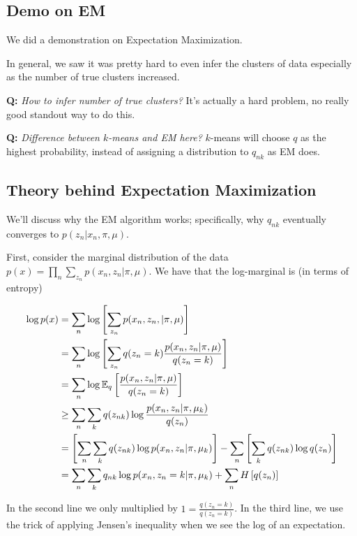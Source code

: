 \documentclass{article}
\begin{document}
\subsection{Demo on EM}

We did a demonstration on Expectation Maximization.

In general, we saw it was pretty hard to even infer the clusters of data especially as the number of true clusters increased. 

{\bf Q:} \emph{How to infer number of true clusters?}  It's actually a hard problem, no really good standout way to do this.

{\bf Q:} \emph{Difference between $k$-means and EM here?}  $k$-means will choose $q$ as the highest probability, instead of assigning a distribution to $q_{nk}$ as EM does.


\subsection{Theory behind Expectation Maximization}

We'll discuss why the EM algorithm works; specifically, why $q_{nk}$ eventually converges to  $p(z_n | x_n, \pi, \mu)$.

First, consider the marginal distribution of the data $\displaystyle p(x) = \prod_n \sum_{z_n} p(x_n, z_n | \pi, \mu)$. We have that the log-marginal is (in terms of entropy) 

\begin{align*}
\log p(x) &= \sum_n \log \left[\sum_{z_n} p(x_n, z_n, | \pi, \mu) \right]\\
&= \sum_n \log \left[ \sum_{z_n} q(z_n = k) \frac{p(x_n, z_n|\pi, \mu)}{q (z_n = k)} \right] \\
&= \sum_n \log \mathbb{E}_q \left[ \frac{p(x_n, z_n | \pi, \mu)}{q(z_n = k)}   \right] \\
&\ge \sum_n \sum_k q(z_{nk}) \log \frac{p(x_n, z_n |\pi, \mu_k)}{q(z_n)} \\
&= \left[\sum_n \sum_k q(z_{nk}) \log p(x_n, z_n |\pi, \mu_k) \right]- \sum_n \left[\sum_k q(z_{nk}) \log q(z_n)\right] \\
&= \sum_n \sum_k q_{nk} \log p(x_n, z_n = k | \pi, \mu_k) + \sum_n H\left[ q(z_n)\right]
\end{align*}

In the second line we only multiplied by $\displaystyle 1 = \frac{q(z_n  = k)}{q(z_n = k)}$.  In the third line, we use the trick of applying Jensen's inequality when we see the log of an expectation.
\end{document}
